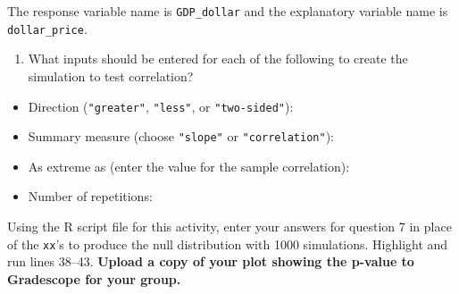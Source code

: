 \documentclass[
]{report}
\providecommand{\tightlist}{%
  \setlength{\itemsep}{0pt}\setlength{\parskip}{0pt}}
\begin{document}
The response variable name is \texttt{GDP\_dollar} and the explanatory variable name is \texttt{dollar\_price}.

\begin{enumerate}
\def\labelenumi{\arabic{enumi}.}
\setcounter{enumi}{6}
\tightlist
\item
  What inputs should be entered for each of the following to create the simulation to test correlation?
\end{enumerate}

\vspace{.5 mm}

\begin{itemize}
\tightlist
\item
  Direction (\texttt{"greater"}, \texttt{"less"}, or \texttt{"two-sided"}):
\end{itemize}

\vspace{.2in}

\begin{itemize}
\tightlist
\item
  Summary measure (choose \texttt{"slope"} or \texttt{"correlation"}):
\end{itemize}

\vspace{.2in}

\begin{itemize}
\tightlist
\item
  As extreme as (enter the value for the sample correlation):
\end{itemize}

\vspace{0.2in}

\begin{itemize}
\tightlist
\item
  Number of repetitions:
\end{itemize}

\vspace{.2in}

Using the R script file for this activity, enter your answers for question 7 in place of the \texttt{xx}'s to produce the null distribution with 1000 simulations. Highlight and run lines 38--43. \textbf{Upload a copy of your plot showing the p-value to Gradescope for your group.}
\end{document}

